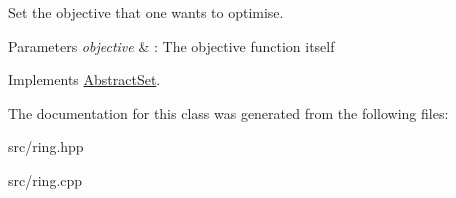 Set the objective that one wants to optimise. 


\begin{DoxyParams}{Parameters}
{\em objective} & \-: The objective function itself \\
\hline
\end{DoxyParams}


Implements \hyperlink{classAbstractSet_a7aef71679a18ab7965d1098da15b26c2}{Abstract\-Set}.



The documentation for this class was generated from the following files\-:\begin{DoxyCompactItemize}
\item 
src/ring.\-hpp\item 
src/ring.\-cpp\end{DoxyCompactItemize}
